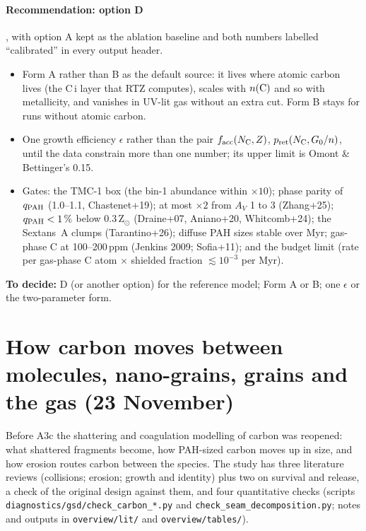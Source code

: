\documentclass[11pt,a4paper]{article}
\newcommand{\NC}{N_{\rm C}}
\begin{document}
\paragraph{Recommendation: option D}, with option A kept as the ablation baseline and both numbers labelled
``calibrated'' in every output header.
\begin{itemize}
\item Form A rather than B as the default source: it lives where atomic carbon lives (the C\,{\sc i} layer that RTZ
  computes), scales with $n({\rm C})$ and so with metallicity, and vanishes in UV-lit gas without an extra cut. Form B
  stays for runs without atomic carbon.
\item One growth efficiency $\epsilon$ rather than the pair $f_{\rm acc}(\NC,Z)$, $p_{\rm ret}(\NC, G_0/n)$, until the
  data constrain more than one number; its upper limit is Omont \& Bettinger's 0.15.
\item Gates: the TMC-1 box (the bin-1 abundance within $\times10$); phase parity of $q_{\rm PAH}$ (1.0--1.1,
  Chastenet+19); at most $\times2$ from $A_V$ 1 to 3 (Zhang+25); $q_{\rm PAH}<1\,\%$ below 0.3\,Z$_\odot$ (Draine+07,
  Aniano+20, Whitcomb+24); the Sextans~A clumps (Tarantino+26); diffuse PAH sizes stable over Myr; gas-phase C at
  100--200\,ppm (Jenkins 2009; Sofia+11); and the budget limit (rate per gas-phase C atom $\times$ shielded fraction
  $\lesssim10^{-3}$ per Myr).
\end{itemize}
\textbf{To decide:} D (or another option) for the reference model; Form A or B; one $\epsilon$ or the two-parameter
form.

\section{How carbon moves between molecules, nano-grains, grains and the gas (23 November)}\label{sec:transfer}

Before A3c the shattering and coagulation modelling of carbon was reopened: what shattered fragments become, how
PAH-sized carbon moves up in size, and how erosion routes carbon between the species. The study has three
literature reviews (collisions; erosion; growth and identity) plus two on survival and release, a check of the
original design against them, and four quantitative checks (scripts \texttt{diagnostics/gsd/check\_carbon\_*.py} and
\texttt{check\_seam\_decomposition.py}; notes and outputs in \texttt{overview/lit/} and \texttt{overview/tables/}).
\end{document}
